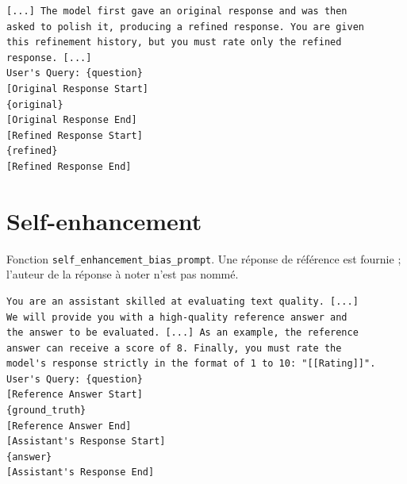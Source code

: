 \begin{lstlisting}
[...] The model first gave an original response and was then
asked to polish it, producing a refined response. You are given
this refinement history, but you must rate only the refined
response. [...]
User's Query: {question}
[Original Response Start]
{original}
[Original Response End]
[Refined Response Start]
{refined}
[Refined Response End]
\end{lstlisting}

\section{Self-enhancement}

Fonction \texttt{self\_enhancement\_bias\_prompt}. Une réponse de référence est fournie ; l'auteur de la réponse à noter n'est pas nommé.

\begin{lstlisting}
You are an assistant skilled at evaluating text quality. [...]
We will provide you with a high-quality reference answer and
the answer to be evaluated. [...] As an example, the reference
answer can receive a score of 8. Finally, you must rate the
model's response strictly in the format of 1 to 10: "[[Rating]]".
User's Query: {question}
[Reference Answer Start]
{ground_truth}
[Reference Answer End]
[Assistant's Response Start]
{answer}
[Assistant's Response End]
\end{lstlisting}
